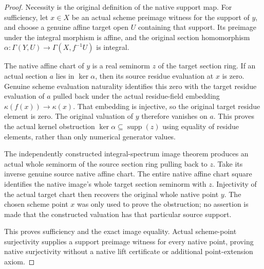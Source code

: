 \begin{proof}
Necessity is the original definition of the native support map. For
sufficiency, let $x\in X$ be an actual scheme preimage witness for the
support of $y$, and choose a genuine affine target open $U$ containing
that support. Its preimage under the integral morphism is affine,
and the original section homomorphism
$\alpha:\Gamma(Y,U)\to\Gamma(X,f^{-1}U)$ is integral.

The native affine chart of $y$ is a real seminorm $z$ of the target
section ring. If an actual section $a$ lies in $\ker\alpha$, then its
source residue evaluation at $x$ is zero. Genuine scheme evaluation
naturality identifies this zero with the target residue evaluation of
$a$ pulled back under the actual residue-field embedding
$\kappa(f(x))\to\kappa(x)$. That embedding is injective, so the original
target residue element is zero. The original valuation of $y$ therefore
vanishes on $a$. This proves the actual kernel obstruction
$\ker\alpha\subseteq\operatorname{supp}(z)$ using equality of residue
elements, rather than only numerical generator values.

The independently constructed integral-spectrum image theorem produces
an actual whole seminorm of the source section ring pulling back to
$z$. Take its inverse genuine source native affine chart. The entire
native affine chart square identifies the native image's whole target
section seminorm with $z$. Injectivity of the actual target chart then
recovers the original whole native point $y$. The chosen scheme point
$x$ was only used to prove the obstruction; no assertion is made that
the constructed valuation has that particular source support.

This proves sufficiency and the exact image equality. Actual
scheme-point surjectivity supplies a support preimage witness for every
native point, proving native surjectivity without a native lift
certificate or additional point-extension axiom.
\end{proof}


